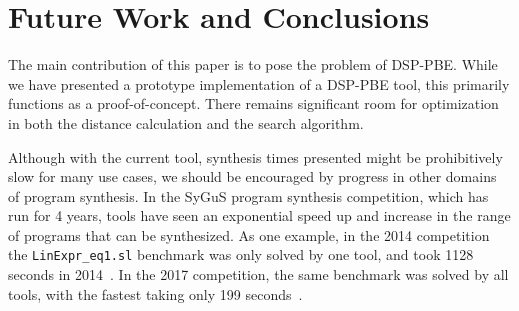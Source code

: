 \section{Future Work and Conclusions}

The main contribution of this paper is to pose the problem of DSP-PBE.
While we have presented a prototype implementation of a DSP-PBE tool, this primarily functions as a proof-of-concept.
There remains significant room for optimization in both the distance calculation and the search algorithm.

Although with the current tool, synthesis times presented might be prohibitively slow for many use cases, we should be encouraged by progress in other domains of program synthesis.
In the SyGuS program synthesis competition, which has run for 4 years, tools have seen an exponential speed up and increase in the range of programs that can be synthesized.
As one example, in the 2014 competition the \texttt{LinExpr\_eq1.sl} benchmark was only solved by one tool, and took 1128 seconds in 2014~\cite{sygus2014}.
In the 2017 competition, the same benchmark was solved by all tools, with the fastest taking only 199 seconds~\cite{sygus2017}.
